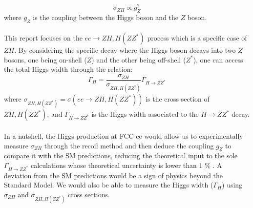 \documentclass[a4paper,11pt]{article}
\begin{document}
    \begin{equation}
        \sigma_{ZH}\propto g^2_Z
    \end{equation}
    where $g_Z$ is the coupling between the Higgs boson and the $Z$ boson.\\\\
    This report focuses on the $ee\rightarrow ZH,H(ZZ^*)$ process which is a specific case of $ZH$. By considering the specific decay where the Higgs boson decays into two $Z$ bosons, one being on-shell ($Z$) and the other being off-shell ($Z^*$), one can access the total Higgs width through the relation:
    \begin{equation}
        \Gamma_H=\frac{\sigma_{ZH}}{\sigma_{ZH,H(ZZ^*)}}\Gamma_{H\rightarrow ZZ^*}
    \end{equation}
    where $\sigma_{ZH,H(ZZ^*)}=\sigma(ee\rightarrow ZH,H(ZZ^*))$ is the cross section of $ZH,H(ZZ^*)$, and $\Gamma_{H\rightarrow ZZ^*}$ is the Higgs width associated to the $H\rightarrow ZZ^*$ decay.\\\\
    In a nutshell, the Higgs production at FCC-ee would allow us to experimentally measure $\sigma_{ZH}$ through the recoil method and then deduce the coupling $g_Z$ to compare it with the \acrshort{SM} predictions, reducing the theoretical input to the sole $\Gamma_{H\rightarrow ZZ^*}$ calculations whose theoretical uncertainty is lower than 1 \% \cite{lhc2011standard}. A deviation from the SM predictions would be a sign of physics beyond the Standard Model. We would also be able to measure the Higgs width ($\Gamma_H$) using $\sigma_{ZH}$ and $\sigma_{ZH,H(ZZ^*)}$ cross sections.
    
\end{document}
